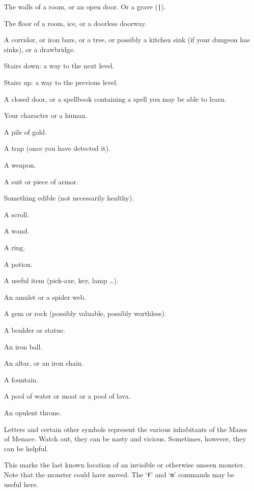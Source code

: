 \blist{}
\item[\tb{- {\rm and} |}]
The walls of a room, or an open door.  Or a grave ({\tt |}).
\item[\tb{.}]
The floor of a room, ice, or a doorless doorway.
\item[\tb{\#}]
A corridor, or iron bars, or a tree, or possibly a kitchen sink (if
your dungeon has sinks), or a drawbridge.
\item[\tb{>}]
Stairs down: a way to the next level.
\item[\tb{<}]
Stairs up: a way to the previous level.
\item[\tb{+}]
A closed door, or a spellbook containing a spell you may be able to learn.
\item[\tb{@}]
Your character or a human.
\item[\tb{\$}]
A pile of gold.
\item[\tb{\^}]
A trap (once you have detected it).
\item[\tb{)}]
A weapon.
\item[\tb{[}]
A suit or piece of armor.
\item[\tb{\%}]
Something edible (not necessarily healthy).
\item[\tb{?}]
A scroll.
\item[\tb{/}]
A wand.
\item[\tb{=}]
A ring.
\item[\tb{!}]
A potion.
\item[\tb{(}]
A useful item (pick-axe, key, lamp \ldots).
\item[\tb{"}]
An amulet or a spider web.
\item[\tb{*}]
A gem or rock (possibly valuable, possibly worthless).
\item[\tb{\`}]
A boulder or statue.
\item[\tb{0}]
An iron ball.
\item[\tb{\verb+_+}]
An altar, or an iron chain.
\item[\tb{\{}]
A fountain.
\item[\tb{\}}]
A pool of water or moat or a pool of lava.
\item[\tb{$\backslash$}]
An opulent throne.
\item[\tb{a-zA-Z {\rm \& other symbols}}]
Letters and certain other symbols represent the various inhabitants
of the Mazes of Menace.  Watch out, they can be nasty and vicious.
Sometimes, however, they can be helpful.
\item[\tb{I}]
This marks the last known location of an invisible or otherwise unseen
monster.  Note that the monster could have moved.
The `{\tt F}' and `{\tt m}' commands may be useful here.


